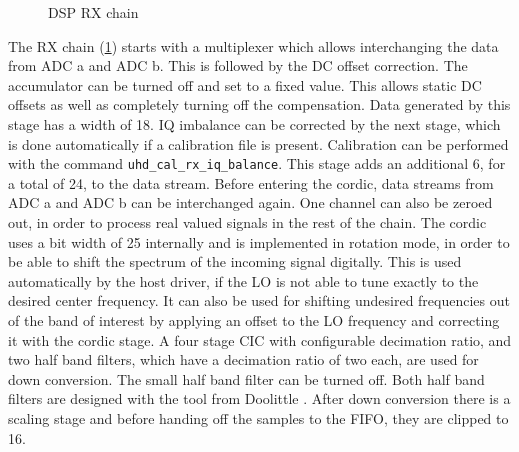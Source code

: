 \documentclass[12pt,a4paper,parskip=full]{scrartcl}
\begin{document}
\begin{figure}[htb]
{}
    \caption{DSP RX chain}
    \label{fig:rxpath}
\end{figure}
The RX chain (\cref{fig:rxpath}) starts with a multiplexer which allows
interchanging the data from ADC a and ADC b. This is followed by the DC offset correction.
The accumulator can be turned off and set to a fixed value.
This allows static DC offsets as well as completely turning off the compensation. Data 
generated by this stage has a width of \SI{18}{\bit}. IQ imbalance can be corrected by the
next stage, which is done automatically if a calibration file is present. Calibration can be
performed with the command \verb+uhd_cal_rx_iq_balance+\cite{usrp_cal}. This stage adds an additional
\SI{6}{\bit}, for a total of \SI{24}{\bit}, to the data stream. Before entering the cordic, data streams from
ADC a and ADC b can be interchanged again. One channel can also be zeroed out, in order to process
real valued signals in the rest of the chain. The cordic uses a bit width of \SI{25}{\bit} internally and is
implemented in rotation mode, in order to be able to shift the spectrum of the incoming signal
digitally. This is used automatically by the host driver, if the LO is not able to tune exactly
to the desired center frequency. It can also be used for shifting undesired frequencies out of
the band of interest by applying an offset to the LO frequency and correcting it with the
cordic stage. A four stage CIC with configurable decimation ratio, and two half band filters, which
have a decimation ratio of two each, are used for down conversion. The small half band filter can
be turned off. Both half band filters are designed with the tool from Doolittle \cite{halfband}.
After down conversion there is a scaling stage and before handing off the samples to the FIFO,
they are clipped to \SI{16}{\bit}.
\end{document}
